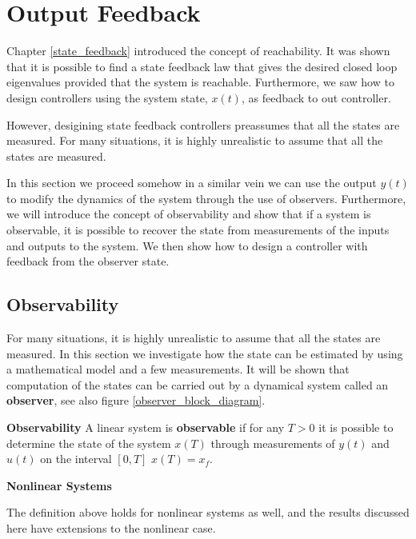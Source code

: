 \chapter{Output Feedback}
\label{output_feedback}

Chapter \ref{state_feedback} introduced the concept of reachability. It was shown that it is possible to find 
a state feedback law that gives the desired closed loop eigenvalues provided that the system
is reachable.  Furthermore, we saw how to design controllers using
the system state, $x(t)$, as feedback to out controller. 

However, desigining state feedback controllers preassumes that all the states are measured. For many situations, it
is highly unrealistic to assume that all the states are measured. 

In this section we proceed somehow in a similar vein we can use the output $y(t)$ to modify the dynamics of the system through the use of observers. Furthermore, we will introduce the concept of observability
and show that if a system is observable, it is possible to recover the state
from measurements of the inputs and outputs to the system. We then show how to
design a controller with feedback from the observer state. 




\section{Observability}
\label{observability}

For many situations, it is highly unrealistic to assume that all the states are measured. In this section we
investigate how the state can be estimated by using a mathematical model and a
few measurements. It will be shown that computation of the states can be carried
out by a dynamical system called an \textbf{observer}, see also figure \ref{observer_block_diagram}.


\begin{framed}
\theoremstyle{definition}
\begin{definition}{\textbf{Observability}}
A linear system is \textbf{observable}  if for any $T>0$ it is possible to determine the state of the system $x(T)$ through measurements of $y(t)$ and $u(t)$ on the interval $[0,T]$  $x(T) = x_f$.
\end{definition}
\end{framed}


\begin{framed}
\theoremstyle{remark}
\begin{remark}{\textbf{Nonlinear Systems}}

The definition above holds for nonlinear systems as well, and the results discussed here have extensions to the nonlinear case.
\end{remark}
\end{framed}


